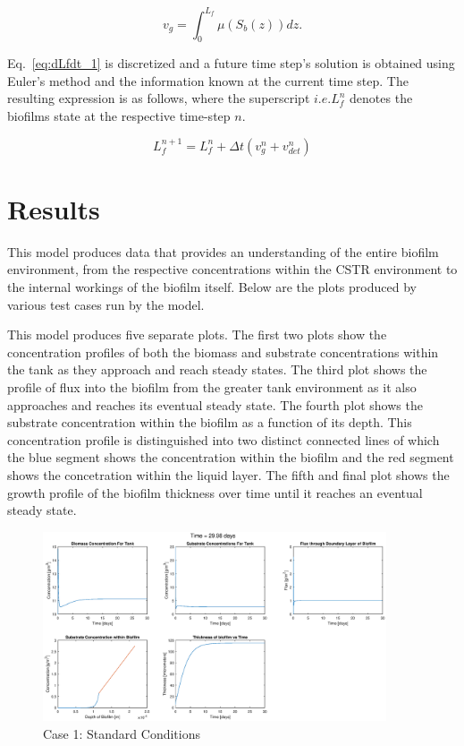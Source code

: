 \documentclass[letterpaper, twoside]{article}
\numberwithin{equation}{section}
\newcommand{\ie}{i.e.}
\begin{document}
\begin{equation}
  \label{eq:vg_int}
  {v_g}={\int_{0}^{L_f}\mu(S_b(z)) dz}.
\end{equation}

Eq.~\ref{eq:dLfdt_1} is discretized and a future time step's solution is obtained using Euler's method and the information known at the current time step. The resulting expression is as follows, where the superscript $\ie L_f^{n}$ denotes the biofilms state at the respective time-step $n$.

\begin{equation}
  \label{eq:dLfdt_2}
  {L_f^{n+1}}={L_f^{n}} + {\Delta t}({v_g^{n}+v_{det}^{n}})
\end{equation}

\section{Results}
This model produces data that provides an understanding of the entire biofilm environment, from the respective concentrations within the CSTR environment to the internal workings of the biofilm itself. Below are the plots produced by various test cases run by the model.

This model produces five separate plots. The first two plots show the concentration profiles of both the biomass and substrate concentrations within the tank as they approach and reach steady states. The third plot shows the profile of flux into the biofilm from the greater tank environment as it also approaches and reaches its eventual steady state. The fourth plot shows the substrate concentration within the biofilm as a function of its depth. This concentration profile is distinguished into two distinct connected lines of which the blue segment shows the concentration within the biofilm and the red segment shows the concetration within the liquid layer. The fifth and final plot shows the growth profile of the biofilm thickness over time until it reaches an eventual steady state.

\begin{figure}[H]
  \centering
  \includegraphics[read=eps, width=4in]{Testcase1_figure.eps}
  \caption{Case 1: Standard Conditions}
\end{figure}
\end{document}
